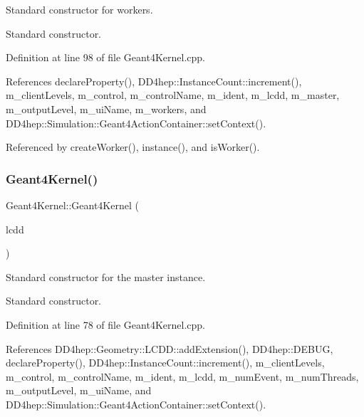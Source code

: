 Standard constructor for workers. 

Standard constructor. 

Definition at line 98 of file Geant4\+Kernel.\+cpp.



References declare\+Property(), D\+D4hep\+::\+Instance\+Count\+::increment(), m\+\_\+client\+Levels, m\+\_\+control, m\+\_\+control\+Name, m\+\_\+ident, m\+\_\+lcdd, m\+\_\+master, m\+\_\+output\+Level, m\+\_\+ui\+Name, m\+\_\+workers, and D\+D4hep\+::\+Simulation\+::\+Geant4\+Action\+Container\+::set\+Context().



Referenced by create\+Worker(), instance(), and is\+Worker().

\hypertarget{class_d_d4hep_1_1_simulation_1_1_geant4_kernel_afa28c3122a6607f3641d22f1c1602786}{}\label{class_d_d4hep_1_1_simulation_1_1_geant4_kernel_afa28c3122a6607f3641d22f1c1602786} 
\subsubsection{\texorpdfstring{Geant4\+Kernel()}{Geant4Kernel()}\hspace{0.1cm}{\footnotesize\ttfamily [2/2]}}
{\footnotesize\ttfamily Geant4\+Kernel\+::\+Geant4\+Kernel (\begin{DoxyParamCaption}\item[{\hyperlink{class_d_d4hep_1_1_simulation_1_1_geant4_kernel_a190e652b62ebce3db3372c4265ffa5a3}{L\+C\+DD} \&}]{lcdd }\end{DoxyParamCaption})}



Standard constructor for the master instance. 

Standard constructor. 

Definition at line 78 of file Geant4\+Kernel.\+cpp.



References D\+D4hep\+::\+Geometry\+::\+L\+C\+D\+D\+::add\+Extension(), D\+D4hep\+::\+D\+E\+B\+UG, declare\+Property(), D\+D4hep\+::\+Instance\+Count\+::increment(), m\+\_\+client\+Levels, m\+\_\+control, m\+\_\+control\+Name, m\+\_\+ident, m\+\_\+lcdd, m\+\_\+num\+Event, m\+\_\+num\+Threads, m\+\_\+output\+Level, m\+\_\+ui\+Name, and D\+D4hep\+::\+Simulation\+::\+Geant4\+Action\+Container\+::set\+Context().


